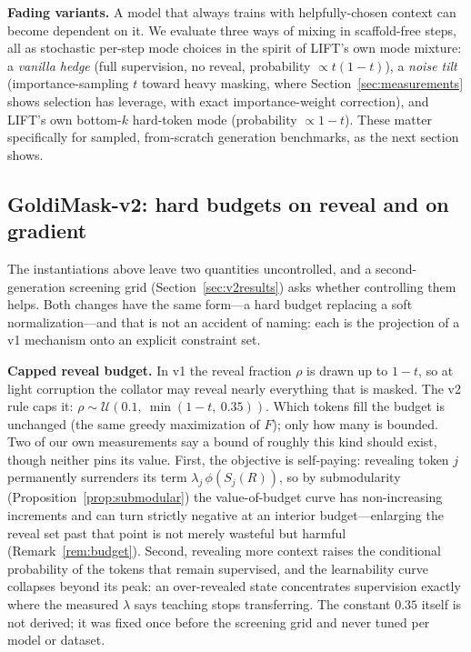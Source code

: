 \documentclass{article} %
\begin{document}
\textbf{Fading variants.} A model that always trains with helpfully-chosen context can become dependent on it. We evaluate three ways of mixing in scaffold-free steps, all as stochastic per-step mode choices in the spirit of LIFT's own mode mixture: a \emph{vanilla hedge} (full supervision, no reveal, probability $\propto t(1-t)$), a \emph{noise tilt} (importance-sampling $t$ toward heavy masking, where Section~\ref{sec:measurements} shows selection has leverage, with exact importance-weight correction), and LIFT's own bottom-$k$ hard-token mode (probability $\propto 1-t$). These matter specifically for sampled, from-scratch generation benchmarks, as the next section shows.

\subsection{GoldiMask-v2: hard budgets on reveal and on gradient}
\label{sec:v2method}

The instantiations above leave two quantities uncontrolled, and a second-generation screening grid (Section~\ref{sec:v2results}) asks whether controlling them helps. Both changes have the same form---a hard budget replacing a soft normalization---and that is not an accident of naming: each is the projection of a v1 mechanism onto an explicit constraint set.

\textbf{Capped reveal budget.} In v1 the reveal fraction $\rho$ is drawn up to $1-t$, so at light corruption the collator may reveal nearly everything that is masked. The v2 rule caps it: $\rho \sim \mathcal{U}(0.1,\ \min(1-t,\ 0.35))$. Which tokens fill the budget is unchanged (the same greedy maximization of $F$); only how many is bounded. Two of our own measurements say a bound of roughly this kind should exist, though neither pins its value. First, the objective is self-paying: revealing token $j$ permanently surrenders its term $\lambda_j\,\phi(S_j(R))$, so by submodularity (Proposition~\ref{prop:submodular}) the value-of-budget curve has non-increasing increments and can turn strictly negative at an interior budget---enlarging the reveal set past that point is not merely wasteful but harmful (Remark~\ref{rem:budget}). Second, revealing more context raises the conditional probability of the tokens that remain supervised, and the learnability curve collapses beyond its peak: an over-revealed state concentrates supervision exactly where the measured $\lambda$ says teaching stops transferring. The constant $0.35$ itself is not derived; it was fixed once before the screening grid and never tuned per model or dataset.
\end{document}
